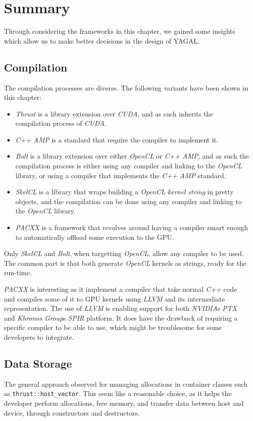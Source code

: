 \section{Summary}
Through considering the frameworks in this chapter, we gained some insights which allow us to make better decisions in the design of YAGAL.

\subsection{Compilation}
The compilation processes are diverse. The following variants have been shown in this chapter:

\begin{itemize}
\item \textit{Thrust} is a library extension over \textit{CUDA}, and as such inherits the compilation process of \textit{CUDA}.
\item \textit{C++ AMP} is a standard that require the compiler to implement it.
\item \textit{Bolt} is a library extension over either \textit{OpenCL} or \textit{C++ AMP}, and as such the compilation process is either using any compiler and linking to the \textit{OpenCL} library, or using a compiler that implements the \textit{C++ AMP} standard.
\item \textit{SkelCL} is a library that wraps building a \textit{OpenCL kernel string} in pretty objects, and the compilation can be done using any compiler and linking to the \textit{OpenCL} library.
\item \textit{PACXX} is a framework that revolves around having a compiler smart enough to automatically offload some execution to the GPU.
\end{itemize}

Only \textit{SkelCL} and \textit{Bolt}, when targetting \textit{OpenCL}, allow any compiler to be used. The common part is that both generate \textit{OpenCL} kernels as strings, ready for the run-time.

\textit{PACXX} is interesting as it implement a compiler that take normal \textit{C++} code and compiles some of it to GPU kernels using \textit{LLVM} and its intermediate representation. The use of \textit{LLVM} is enabling support for both \textit{NVIDIA}s \textit{PTX} and \textit{Khronos Group}s \textit{SPIR} platform. It does have the drawback of requiring a specific compiler to be able to use, which might be troublesome for some developers to integrate.

\subsection{Data Storage}
The general approach observed for managing allocations in container classes such as \texttt{thrust::host\_vector}. This seem like a reasonable choice, as it helps the developer perform allocations, free memory, and transfer data between host and device, through constructors and destructors.

